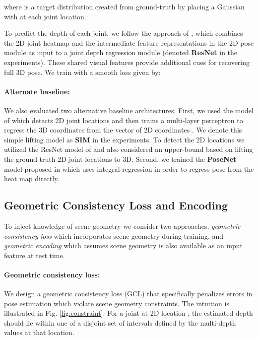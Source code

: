 \documentclass[times,referee,twocolumn,final,authoryear]{elsarticle}
\begin{document}
where  is a target distribution created from ground-truth  by placing
a Gaussian with  at each joint location. 

To predict the depth of each joint, we follow the approach of
\cite{Zhou_2017_ICCV}, which combines the 2D joint heatmap and the
intermediate feature representations in the 2D pose module as input to a joint
depth regression module (denoted {\bf ResNet} in the experiments). These shared 
visual features provide additional cues for recovering full 3D pose. We train 
with a smooth  loss
\cite{fasterRCNN} given by:



\paragraph{Alternate baseline:} We also evaluated two alternative 
baseline architectures. First, we used the model of \cite{simple} which detects 2D joint 
locations and then trains a multi-layer perceptron to regress the 3D coordinates  from 
the vector of 2D coordinates . We denote this simple lifting model as {\bf SIM} 
in the experiments.  To detect the 2D locations we utilized the ResNet model of \cite{xiao2018simple} 
and also considered an upper-bound based on lifting the ground-truth 2D joint locations to 3D.
Second, we trained the {\bf PoseNet} model proposed in \cite{rootnet} which uses integral 
regression \citep{integral} in order to regress pose from the heat map directly.   


\subsection{Geometric Consistency Loss and Encoding}

To inject knowledge of scene geometry we consider two approaches, {\em 
geometric consistency loss} which incorporates scene geometry during training, 
and {\em geometric encoding} which assumes scene geometry is also available as 
an input feature at test time.

\paragraph{Geometric consistency loss:}
We design a geometric consistency loss (GCL) that specifically penalizes errors in 
pose estimation which violate scene geometry constraints. The intuition is illustrated
in Fig. \ref{fig:constraint}. For a joint at 2D location , the estimated depth
 should lie within one of a disjoint set of intervals defined by the multi-depth
values at that location.
\end{document}
